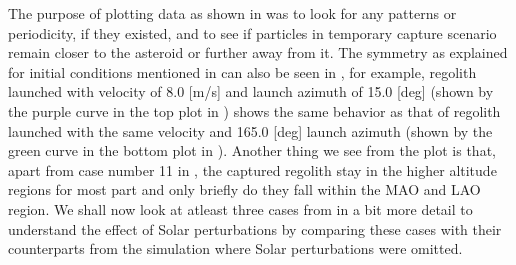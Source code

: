 \FloatBarrier
The purpose of plotting data as shown in  was to look for any patterns or periodicity, if they existed, and to see if particles in temporary capture scenario remain closer to the asteroid or further away from it. The symmetry as explained for initial conditions mentioned in  can also be seen in , for example, regolith launched with velocity of 8.0 [m/s] and launch azimuth of 15.0 [deg] (shown by the purple curve in the top plot in ) shows the same behavior as that of regolith launched with the same velocity and 165.0 [deg] launch azimuth (shown by the green curve in the bottom plot in ). Another thing we see from the plot is that, apart from case number 11 in , the captured regolith stay in the higher altitude regions for most part and only briefly do they fall within the \gls{MAO} and \gls{LAO} region. We shall now look at atleast three cases from  in a bit more detail to understand the effect of Solar perturbations by comparing these cases with their counterparts from the simulation where Solar perturbations were omitted.

